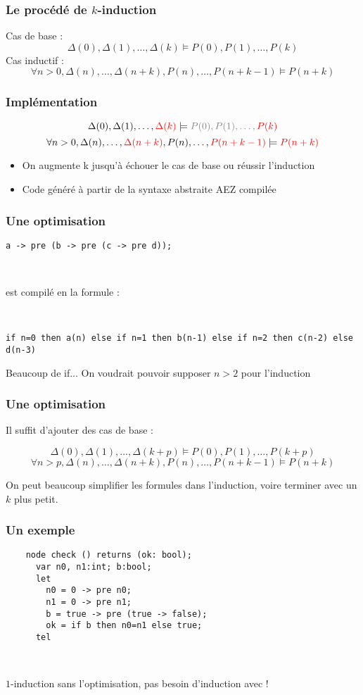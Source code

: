 \documentclass[18pt]{beamer}
\begin{document}
\begin{frame}
	\frametitle{Le procédé de $k$-induction}
	Cas de base :	$$\Delta(0), \Delta(1), \ldots, \Delta(k) \models  P(0), P(1), \ldots,  P(k)$$
	Cas inductif : $$\forall n>0, {\Delta(n), \ldots, \Delta(n+k), P(n), \ldots, P(n+k-1) \models P(n+k)}$$

\end{frame}	
\begin{frame}
	\frametitle{Implémentation}

		
			$$\Delta(0), \Delta(1), \ldots, \color{red} \Delta(k) \color{black} \models \color{gray} P(0), P(1), \ldots, \color{red} P(k)\color{black}$$
			$$\forall n>0, {\Delta(n), \ldots, \color{red} \Delta(n+k) \color{black}, P(n), \ldots, \color{red}P(n+k-1) \color{black} \models  \color{red}P(n+k)}\color{black}$$
	\begin{itemize}
		\item{On augmente k jusqu'à échouer le cas de base ou réussir l'induction}
		\item{Code généré à partir de la syntaxe abstraite AEZ compilée}
	\end{itemize}	
\end{frame}
\begin{frame}[fragile]
	\frametitle{Une optimisation}
	
	\texttt{a -> pre (b -> pre (c -> pre d));}
	
	\
	
	est compilé en la formule :
	
	\
	
	\texttt{if n=0 then a(n) else if n=1 then b(n-1) else if n=2 then c(n-2) else d(n-3)}
	
	\bigskip
	
	Beaucoup de if... On voudrait pouvoir supposer $n>2$ pour l'induction
\end{frame}
\begin{frame}
	\frametitle{Une optimisation}
	Il suffit d'ajouter des cas de base :
	
	$$\Delta(0), \Delta(1), \ldots, \Delta(k+p) \models P(0), P(1), \ldots, P(k+p)$$
	$$\forall n>p, {\Delta(n), \ldots, \Delta(n+k), P(n), \ldots, P(n+k-1) \models P(n+k)}$$
	
	On peut beaucoup simplifier les formules dans l'induction, voire terminer avec un $k$ plus petit.
\end{frame}
\begin{frame}[fragile]
	\frametitle{Un exemple}
	\begin{lstlisting}
	node check () returns (ok: bool);
	  var n0, n1:int; b:bool;
	  let
	    n0 = 0 -> pre n0;
	    n1 = 0 -> pre n1;
	    b = true -> pre (true -> false);
	    ok = if b then n0=n1 else true;
	  tel
	\end{lstlisting}
	
	\
	
	$1$-induction sans l'optimisation, pas besoin d'induction avec !
\end{frame}
\end{document}
